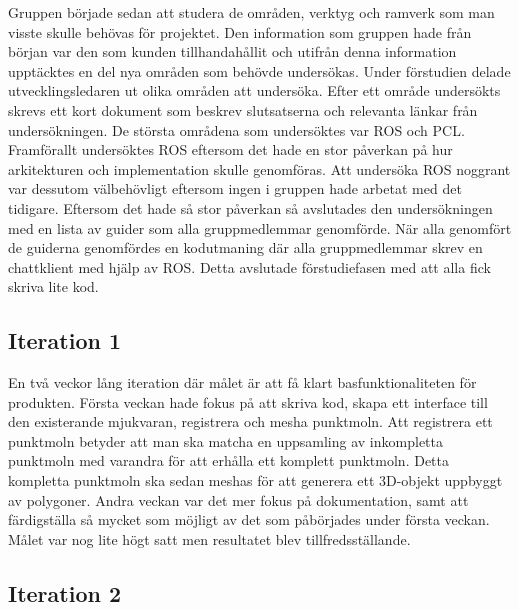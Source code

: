 Gruppen började sedan att studera de områden, verktyg och ramverk som man visste skulle behövas för projektet. Den information som gruppen hade från början var den som kunden tillhandahållit och utifrån denna information upptäcktes en del nya områden som behövde undersökas. Under förstudien delade utvecklingsledaren ut olika områden att undersöka. Efter ett område undersökts skrevs ett kort dokument som beskrev slutsatserna och relevanta länkar från undersökningen. De största områdena som undersöktes var ROS och PCL. Framförallt undersöktes ROS eftersom det hade en stor påverkan på hur arkitekturen och implementation skulle genomföras. Att undersöka ROS noggrant var dessutom välbehövligt eftersom ingen i gruppen hade arbetat med det tidigare. Eftersom det hade så stor påverkan så avslutades den undersökningen med en lista av guider som alla gruppmedlemmar genomförde. När alla genomfört de guiderna genomfördes en kodutmaning där alla gruppmedlemmar skrev en chattklient med hjälp av ROS. Detta avslutade förstudiefasen med att alla fick skriva lite kod. 

\subsection{Iteration 1}

En två veckor lång iteration där målet är att få klart basfunktionaliteten för produkten. Första veckan hade fokus på att skriva kod, skapa ett interface till den existerande mjukvaran, registrera och mesha punktmoln. Att registrera ett punktmoln betyder att man ska matcha en uppsamling av inkompletta punktmoln med varandra för att erhålla ett komplett punktmoln. Detta kompletta punktmoln ska sedan meshas för att generera ett 3D-objekt uppbyggt av polygoner. Andra veckan var det mer fokus på dokumentation, samt att färdigställa så mycket som möjligt av det som påbörjades under första veckan. Målet var nog lite högt satt men resultatet blev tillfredsställande.

\subsection{Iteration 2}

